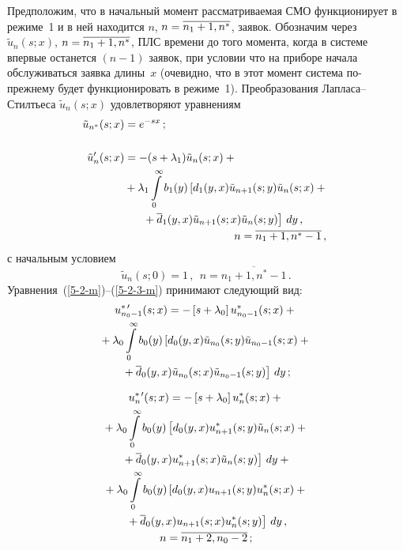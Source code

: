 \begin{multicols}{2}
Предположим, что в начальный момент рас\-смат\-ри\-ва\-емая
СМО функционирует в режиме~1 и в ней находится
$n$, $n\hm=\overline{n_1+1,n^*}$, заявок.
Обозначим через $\tilde{u}_n(s;x)$, $n\hm=\overline{n_1+1,n^*}$, ПЛС времени до того момента,
когда в системе впервые останется $(n-1)$ заявок,
при условии что на приборе начала
обслуживаться заявка длины~$x$ (очевидно, что в этот
момент система по-преж\-не\-му будет функционировать в режиме~1).
Преобразования Лап\-ла\-са--Стил\-тье\-са $\tilde{u}_n(s;x)$ удовлетворяют уравнениям 
\begin{align*}
\tilde{u}_{n^*}(s;x)&= e^{-sx} \,;\\
\\
\tilde{u}'_n(s;x) &= - (s + \lambda_1) \tilde{u}_{n}(s;x) +{}
\\
&{}+
\lambda_1 \int\limits_0^\infty b_1(y) \left[d_1(y,x) \tilde{u}_{n+1}(s;y) \tilde{u}_{n}(s;x)
+ {}\right.\\
&\hspace*{5mm}\left.{}+\d_1(y,x) \tilde{u}_{n+1}(s;x) \tilde{u}_{n}(s;y)\right] \, dy\,,
\\  
&\hspace*{35mm}n=\overline{n_{1}+1,n^*-1}\,,
\end{align*}
с начальным условием
$$
\tilde{u}_n(s;0)=1\,,
\ \ n=\overline{n_1+1,n^*-1}\,.
$$
Уравнения~(\ref{5-2-m})--(\ref{5-2-3-m}) принимают следующий вид:
\begin{multline*}
u^{*\,\prime}_{n_0-1}(s;x) = - \left[s + \lambda_0\right] u^*_{n_0-1}(s;x)
+{}
\\
{}+
\lambda_0 \int\limits_0^\infty b_0(y) \left[d_0(y,x) \tilde{u}_{n_0}(s;y) \tilde{u}_{n_0-1}(s;x)
+{}\right.\\
\left.{}+ \overline d_0(y,x) \tilde{u}_{n_0}(s;x) \tilde{u}_{n_0-1}(s;y)\right]\, dy \,;
\end{multline*}

\vspace*{-12pt}

\noindent
\begin{multline*}
u^{*\,\prime}_n(s;x) = - \left[s + \lambda_0\right] u^*_{n}(s;x)
+{}
\\
{}+ \lambda_0 \int\limits_0^\infty b_0(y) \left[d_0(y,x) u^*_{n+1}(s;y) \tilde{u}_n(s;x)
+ {}\right.\\
\left.{}+\overline d_0(y,x) u^*_{n+1}(s;x) \tilde{u}_n(s;y)\right] \, dy +{}\\
{}+
\lambda_0 \int\limits_0^\infty b_0(y) \left[d_0(y,x) u_{n+1}(s;y) u^*_{n}(s;x)
+{}\right.\\
\left.{}+\overline d_0(y,x) u_{n+1}(s;x) u^*_{n}(s;y)\right]\, dy\,,
\\ n=\overline{n_1+2,n_0-2}\,;
\end{multline*}


\end{multicols}
